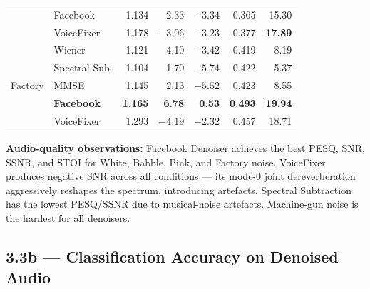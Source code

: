 \documentclass[12pt,a4paper,onecolumn]{exam}
\newcommand{\best}[1]{\cellcolor{bestcol}\textbf{#1}}
\begin{document}
\begin{table}
\begin{tabular}{llrrrrr}
 & Facebook       & 1.134 &  2.33 & $-3.34$ & 0.365 & 15.30 \\
 & VoiceFixer     & 1.178 & $-3.06$ & \best{$-3.23$} & 0.377 & \best{17.89} \\
\midrule
\multirow{5}{*}{Factory}
 & Wiener         & 1.121 &  4.10 & $-3.42$ & 0.419 &  8.19 \\
 & Spectral Sub.  & 1.104 &  1.70 & $-5.74$ & 0.422 &  5.37 \\
 & MMSE           & 1.145 &  2.13 & $-5.52$ & 0.423 &  8.55 \\
 & \best{Facebook}& \best{1.165} & \best{6.78} & \best{0.53} & \best{0.493} & \best{19.94} \\
 & VoiceFixer     & 1.293 & $-4.19$ & $-2.32$ & 0.457 & 18.71 \\
\bottomrule
\end{tabular}
\end{table}

\noindent\textbf{Audio-quality observations:}
Facebook Denoiser achieves the best PESQ, SNR, SSNR, and STOI for White, Babble, Pink, and Factory noise.
VoiceFixer produces negative SNR across all conditions --- its mode-0 joint dereverberation aggressively reshapes the spectrum, introducing artefacts.
Spectral Subtraction has the lowest PESQ/SSNR due to musical-noise artefacts.
Machine-gun noise is the hardest for all denoisers.

\subsection*{3.3b --- Classification Accuracy on Denoised Audio}
\end{document}
